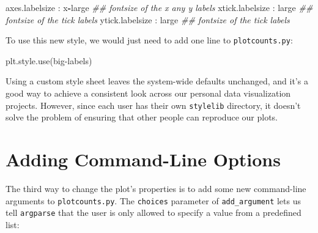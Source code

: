 \documentclass[
]{krantz}
\makeatletter
\newenvironment{Shaded}{\begin{snugshade}}{\end{snugshade}}
\newcommand{\CommentTok}[1]{\textcolor[rgb]{0.56,0.35,0.01}{\textit{#1}}}
\newcommand{\NormalTok}[1]{#1}
\newcommand{\OperatorTok}[1]{\textcolor[rgb]{0.81,0.36,0.00}{\textbf{#1}}}
\newcommand{\StringTok}[1]{\textcolor[rgb]{0.31,0.60,0.02}{#1}}
\newenvironment{kframe}{%
\medskip{}
\setlength{\fboxsep}{.8em}
 \def\at@end@of@kframe{}%
 \ifinner\ifhmode%
  \def\at@end@of@kframe{\end{minipage}}%
  \begin{minipage}{\columnwidth}%
 \fi\fi%
 \def\FrameCommand##1{\hskip\@totalleftmargin \hskip-\fboxsep
 \colorbox{shadecolor}{##1}\hskip-\fboxsep
     \hskip-\linewidth \hskip-\@totalleftmargin \hskip\columnwidth}%
 \MakeFramed {\advance\hsize-\width
   \@totalleftmargin\z@ \linewidth\hsize
   \@setminipage}}%
 {\par\unskip\endMakeFramed%
 \at@end@of@kframe}
\renewenvironment{Shaded}{\begin{kframe}}{\end{kframe}}
\makeatother
\begin{document}
\begin{Shaded}
\begin{Highlighting}[]
\NormalTok{axes.labelsize   : x}\OperatorTok{{-}}\NormalTok{large  }\CommentTok{\#\# fontsize of the x any y labels}
\NormalTok{xtick.labelsize  : large    }\CommentTok{\#\# fontsize of the tick labels}
\NormalTok{ytick.labelsize  : large    }\CommentTok{\#\# fontsize of the tick labels}
\end{Highlighting}
\end{Shaded}

To use this new style,
we would just need to add one line to \texttt{plotcounts.py}:

\begin{Shaded}
\begin{Highlighting}[]
\NormalTok{plt.style.use(}\StringTok{\textquotesingle{}big{-}labels\textquotesingle{}}\NormalTok{)}
\end{Highlighting}
\end{Shaded}

Using a custom style sheet leaves the system-wide defaults unchanged,
and it's a good way to achieve a consistent look across our personal data visualization projects.
However,
since each user has their own \texttt{stylelib} directory,
it doesn't solve the problem of ensuring that other people can reproduce our plots.

\hypertarget{config-command-line}{%
\section{Adding Command-Line Options}\label{config-command-line}}

The third way to change the plot's properties
is to add some new command-line arguments to \texttt{plotcounts.py}.
The \texttt{choices} parameter of \texttt{add\_argument} lets us tell \texttt{argparse}
that the user is only allowed to specify a value from a predefined list:
\end{document}
